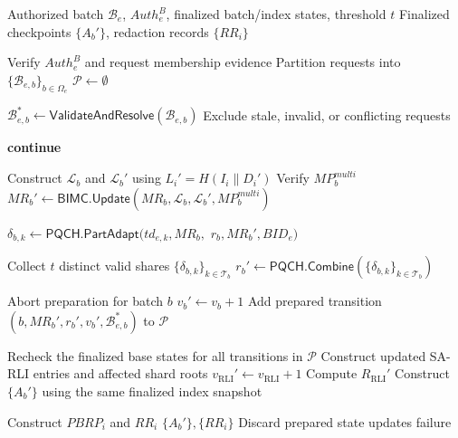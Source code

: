 \documentclass[lettersize,journal]{IEEEtran}
\begin{document}
    
    \begin{algorithm}[t]
    \caption{Authorized Batch Redaction and
    Verifiable State Update}
    \label{alg:redaction}
    \begin{algorithmic}[1]
    \Require Authorized batch $\mathcal{B}_e$,
    $Auth_e^B$, finalized batch/index states,
    threshold $t$
    \Ensure Finalized checkpoints $\{A_b'\}$,
    redaction records $\{RR_i\}$
    
    \State Verify $Auth_e^B$ and request
    membership evidence
    \State Partition requests into
    $\{\mathcal{B}_{e,b}\}_{b\in\Omega_e}$
    \State $\mathcal{P}\gets\emptyset$
    
        \State $\mathcal{B}_{e,b}^{*}\gets
        \mathsf{ValidateAndResolve}
        (\mathcal{B}_{e,b})$
        \State Exclude stale, invalid, or
        conflicting requests
    
            \State \textbf{continue}
        \EndIf
    
        \State Construct $\mathcal{L}_b$ and
        $\mathcal{L}_b'$ using
        $L_i'=H(I_i\parallel D_i')$
        \State Verify $MP_b^{multi}$
        \State $MR_b'\gets
        \mathsf{BIMC.Update}
        (MR_b,\mathcal{L}_b,\mathcal{L}_b',
        MP_b^{multi})$
    
            \State $\delta_{b,k}\gets
            \mathsf{PQCH.PartAdapt}(td_{e,k},MR_b,$
            \Statex \hspace{3.2em}$r_b,MR_b',BID_e)$
        \EndFor
    
        \State Collect $t$ distinct valid shares
        $\{\delta_{b,k}\}_{k\in\mathcal{T}_b}$
        \State $r_b'\gets
        \mathsf{PQCH.Combine}
        (\{\delta_{b,k}\}_{k\in\mathcal{T}_b})$
    
            \State Abort preparation
            for batch $b$
        \Else
            \State $v_b'\gets v_b+1$
            \State Add prepared transition
            $(b,MR_b',r_b',v_b',
            \mathcal{B}_{e,b}^{*})$ to
            $\mathcal{P}$
        \EndIf
    \EndFor
    
    \State Recheck the finalized base states
    for all transitions in $\mathcal{P}$
    \State Construct updated SA-RLI entries
    and affected shard roots
    \State $v_{\mathrm{RLI}}'\gets
    v_{\mathrm{RLI}}+1$
    \State Compute $R_{\mathrm{RLI}}'$
    \State Construct $\{A_b'\}$ using the
    same finalized index snapshot
    
            \State Construct $PBRP_i$
            and $RR_i$
        \EndFor
        \State \Return
        $\{A_b'\},\{RR_i\}$
    \Else
        \State Discard prepared state updates
        \State \Return failure
    \EndIf
    \end{algorithmic}
    \end{algorithm}
    
\end{document}
